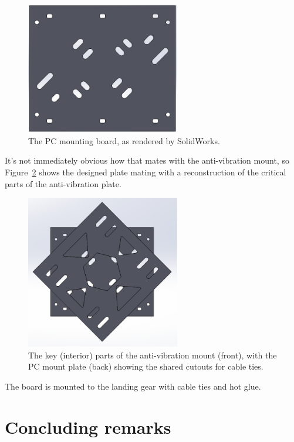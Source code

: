 \documentclass[12pt,oneside,a4paper]{book}
\begin{document}
\begin{figure}[h]
  \centering
    \includegraphics[width=0.6\textwidth]{figs/pc-mount}
  \caption{The PC mounting board, as rendered by SolidWorks.}
  \label{fig:pc-mount}
\end{figure}

It's not immediately obvious how that mates with the anti-vibration
mount, so Figure~\ref{fig:pc-avm-mount} shows the designed plate
mating with a reconstruction of the critical parts of the
anti-vibration plate.

\begin{figure}[h]
  \centering
  \includegraphics[width=0.6\textwidth]{figs/pc-avm}
  \caption{The key (interior) parts of the anti-vibration mount (front), with the PC mount plate (back) showing the shared cutouts for cable ties.}
  \label{fig:pc-avm-mount}
\end{figure}
The board is mounted to the landing gear with cable ties and hot glue.

\section{Concluding remarks}
\label{sec:concluding-remarks}
\end{document}
